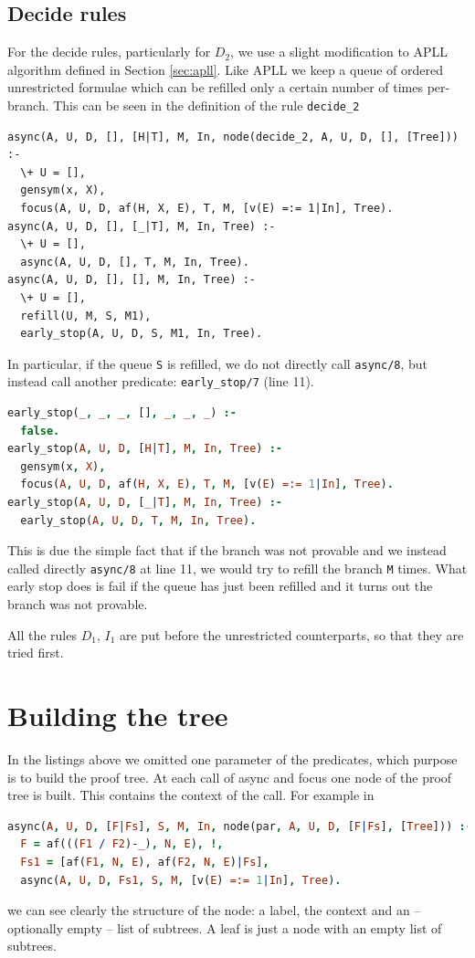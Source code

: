 \documentclass[a4paper, 12pt, tesi, english]{report}
\begin{document}
\subsection{Decide rules}\label{sec:decide}
For the decide rules, particularly for $D_2$, we use a slight modification to APLL algorithm defined in Section \ref{sec:apll}.
Like APLL we keep a queue of ordered unrestricted formulae which can be refilled only a certain number of times per-branch.
This can be seen in the definition of the rule \texttt{decide\_2}
\begin{lstlisting}
async(A, U, D, [], [H|T], M, In, node(decide_2, A, U, D, [], [Tree])) :-
  \+ U = [],
  gensym(x, X),
  focus(A, U, D, af(H, X, E), T, M, [v(E) =:= 1|In], Tree).
async(A, U, D, [], [_|T], M, In, Tree) :-
  \+ U = [],
  async(A, U, D, [], T, M, In, Tree).
async(A, U, D, [], [], M, In, Tree) :-
  \+ U = [],
  refill(U, M, S, M1),
  early_stop(A, U, D, S, M1, In, Tree).
\end{lstlisting}
In particular, if the queue \texttt{S} is refilled, we do not directly call \texttt{async/8}, but instead call another predicate: \texttt{early\_stop/7} (line 11).
\begin{lstlisting}[language=prolog, numbers=none]
early_stop(_, _, _, [], _, _, _) :-
  false.
early_stop(A, U, D, [H|T], M, In, Tree) :-
  gensym(x, X),
  focus(A, U, D, af(H, X, E), T, M, [v(E) =:= 1|In], Tree).
early_stop(A, U, D, [_|T], M, In, Tree) :-
  early_stop(A, U, D, T, M, In, Tree).
\end{lstlisting}
This is due the simple fact that if the branch was not provable and we instead called directly \texttt{async/8} at line 11, we would try to refill the branch \texttt{M} times.
What early stop does is fail if the queue has just been refilled and it turns out the branch was not provable.

All the rules $D_1$, $I_1$ are put before the unrestricted counterparts, so that they are tried first.

\section{Building the tree}
In the listings above we omitted one parameter of the predicates, which purpose is to build the proof tree.
At each call of async and focus one node of the proof tree is built.
This contains the context of the call.
For example in
\begin{lstlisting}[language=prolog, numbers=none]
async(A, U, D, [F|Fs], S, M, In, node(par, A, U, D, [F|Fs], [Tree])) :- 
  F = af(((F1 / F2)-_), N, E), !,
  Fs1 = [af(F1, N, E), af(F2, N, E)|Fs],
  async(A, U, D, Fs1, S, M, [v(E) =:= 1|In], Tree).
\end{lstlisting}
we can see clearly the structure of the node: a label, the context and an -- optionally empty -- list of subtrees.
A leaf is just a node with an empty list of subtrees.
\end{document}

